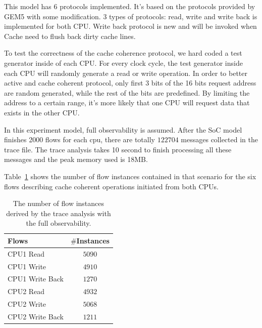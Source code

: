 \documentclass[12pt,frontmatter,copyright,thesis]{usfmanus}
\begin{document}
This model has 6 protocols implemented. It's based on the protocols provided by GEM5 with some modification. 3 types of protocols: read, write and write back is implemented for both CPU. Write back protocol is new and will be invoked when Cache need to flush back dirty cache lines.

To test the correctness of the cache coherence protocol, we hard coded a test generator inside
of each CPU. 
For every clock cycle, the test generator inside each CPU will randomly generate a read or write operation. In order to better active and cache coherent protocol, only first 3 bits of the 16 bits request address are random generated, while the rest of the bits are predefined. By limiting the address to a certain range, it's more likely that one CPU will request data that exists in the other CPU.

In this experiment model, full observability is assumed.
After the SoC model finishes 2000 flows for each cpu, there
are totally $122704$ messages collected in the trace file.
The trace analysis takes 10 second to finish processing
all these messages and the peak memory used is 18MB.



Table~\ref{table-case-3} shows the number of flow instances contained in that
scenario for the six 
flows describing cache coherent operations initiated from both CPUs.
\begin{table}[h]
\caption{The number of flow instances derived by the trace analysis with the full observability.}
\begin{center}
\begin{tabular}{|l|c|}
\hline
Flows & $\#$Instances \\
\hline
\hline
CPU1 Read			&  $5090$\\
CPU1 Write				&  $4910$\\
CPU1 Write Back				&  $1270$\\

\hline
CPU2 Read			&  $4932$\\
CPU2 Write				&  $5068$\\
CPU2 Write Back				&  $1211$\\
\hline
\end{tabular}
\end{center}
\label{table-case-3}
\end{table}%
\end{document}
